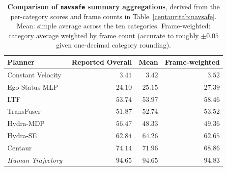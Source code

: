 \begin{table}[htb]
  \centering
  \caption[\texttt{navsafe} Overall under two aggregations]{\textbf{Comparison of \texttt{navsafe} summary aggregations}, derived from the per-category scores and frame counts in Table~\ref{centaur:tab:navsafe}. Mean: simple average across the ten categories. Frame-weighted: category average weighted by frame count (accurate to roughly $\pm 0.05$ given one-decimal category rounding).}
  \label{centaur:tab:navsafe_overall}
  \begin{tabular}{l|r|rr}
    \toprule
    \textbf{Planner} & \textbf{Reported Overall} & \textbf{Mean} & \textbf{Frame-weighted} \\
    \midrule
    Constant Velocity~\cite{dauner2024navsim} & $3.41$ & $3.42$ & $3.52$ \\
    Ego Status MLP~\cite{dauner2024navsim} & $24.10$ & $25.15$ & $27.39$ \\
    LTF~\cite{chitta2023transfuser} & $53.74$ & $53.97$ & $58.46$ \\
    TransFuser~\cite{chitta2023transfuser} & $51.87$ & $52.74$ & $53.52$ \\
    Hydra-MDP~\cite{li2024hydramdp} & $56.47$ & $48.33$ & $49.36$ \\
    \midrule
    Hydra-SE & $62.84$ & $64.26$ & $62.65$ \\
    Centaur & $74.14$ & $71.96$ & $68.86$ \\
    \midrule
    \textit{Human Trajectory} & $\mathit{94.65}$ & $\mathit{94.65}$ & $\mathit{94.83}$ \\
    \bottomrule
  \end{tabular}
\end{table}
